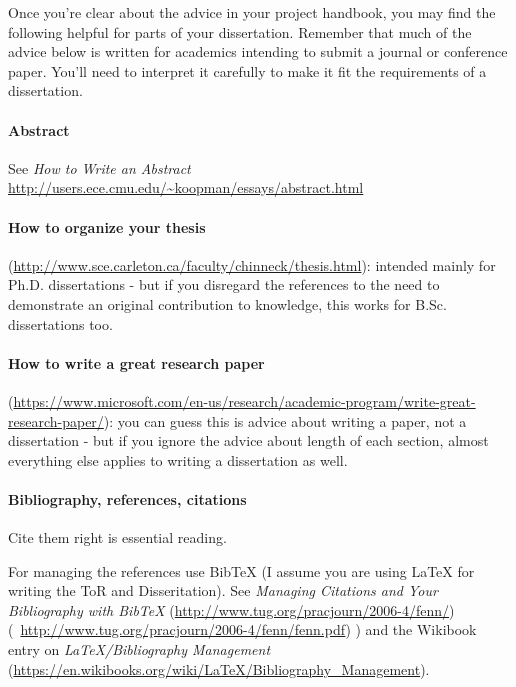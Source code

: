 \documentclass{tufte-handout}
\begin{document}
Once you're clear about the advice in your project handbook, you may find the
following helpful for parts of your dissertation.  Remember that much of the
advice below is written for academics intending to submit a journal or
conference paper.  You'll need to interpret it carefully to make it fit the
requirements of a dissertation.

\paragraph{Abstract }

See \emph{How to Write an Abstract}
\url{http://users.ece.cmu.edu/~koopman/essays/abstract.html}


\paragraph{How to organize your
thesis}(\url{http://www.sce.carleton.ca/faculty/chinneck/thesis.html}):
intended mainly for Ph.D. dissertations - but if you disregard the references
to the need to demonstrate an original contribution to knowledge, this works
for B.Sc. dissertations too.

\paragraph{How to write a great research
paper}(\url{https://www.microsoft.com/en-us/research/academic-program/write-great-research-paper/}):
you can guess this is advice about writing a paper, not a dissertation - but
if you ignore the advice about length of each section, almost everything else
applies to writing a dissertation as well.


\paragraph{ Bibliography, references, citations}
Cite them right
	is essential reading.

For managing the references use BibTeX (I assume you are using LaTeX for
writing the ToR and Disseritation).  See \emph{Managing Citations and Your
Bibliography with BibTeX} (\url{http://www.tug.org/pracjourn/2006-4/fenn/})
(\faFilePdfO~\url{http://www.tug.org/pracjourn/2006-4/fenn/fenn.pdf})
) and the Wikibook entry on \emph{LaTeX/Bibliography Management}
(\url{https://en.wikibooks.org/wiki/LaTeX/Bibliography_Management}).
\end{document}
